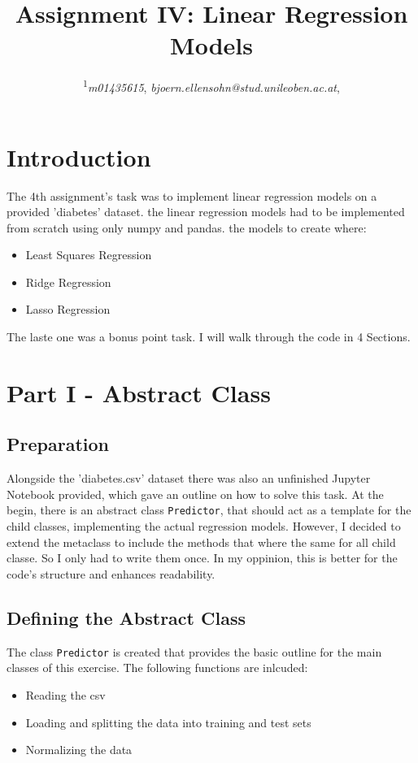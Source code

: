 \documentclass{CPSReport}
\title{Assignment IV: Linear Regression Models} %
\author{
	\coursetitle{Introduction to Machine Learning Lab (190.013), SS2023}
	\authorstyle{Björn Ellensohn\textsuperscript{1}} %
	\newline\newline %
	\textsuperscript{1}\textit{m01435615}, \textit{bjoern.ellensohn@stud.unileoben.ac.at}, \institution{Montanuniversität Leoben, Austria}\\ %
	\submissiondate{\today} %
}
\begin{document}
\maketitle %

\thispagestyle{firstpage} %



\section{Introduction}
The 4th assignment's task was to implement linear regression models on a provided 'diabetes' dataset.
the linear regression models had to be implemented from scratch using only numpy and pandas. the models to create where:
\begin{itemize}
    \item Least Squares Regression
    \item Ridge Regression
    \item Lasso Regression
\end{itemize}

The laste one was a bonus point task.
I will walk through the code in 4 Sections.

\section{Part I - Abstract Class}
\subsection{Preparation}
Alongside the 'diabetes.csv' dataset there was also an unfinished Jupyter Notebook provided, which gave an outline on how to solve this task. At the begin, there is an abstract class \texttt{Predictor}, that should act as a template for the child classes, implementing the actual regression models. However, I decided to extend the metaclass to include the methods that where the same for all child classe. So I only had to write them once. In my oppinion, this is better for the code's structure and enhances readability.

\subsection{Defining the Abstract Class}
The class \texttt{Predictor} is created that provides the basic outline for the main classes of this exercise. The following functions are inlcuded:
\begin{itemize}
    \item Reading the csv
    \item Loading and splitting the data into training and test sets
    \item Normalizing the data
\end{itemize}
\end{document}

